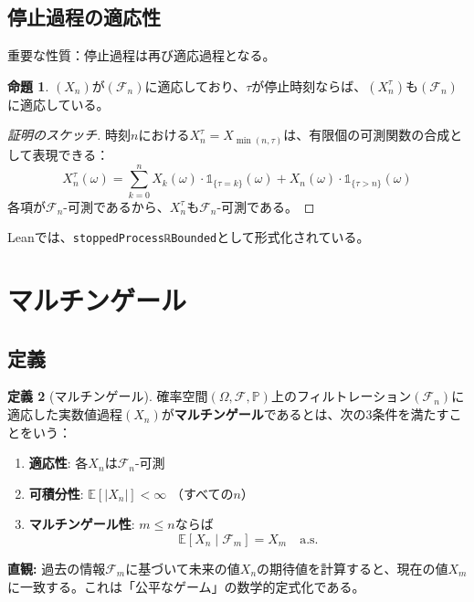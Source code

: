 \documentclass[a4paper,11pt]{ltjsarticle}
\theoremstyle{definition}
\newtheorem{definition}{定義}[section]
\newtheorem{proposition}[definition]{命題}
\begin{document}
\subsection{停止過程の適応性}

重要な性質：停止過程は再び適応過程となる。

\begin{proposition}
$(X_n)$が$(\mathcal{F}_n)$に適応しており、$\tau$が停止時刻ならば、$(X^{\tau}_n)$も$(\mathcal{F}_n)$に適応している。
\end{proposition}

\begin{proof}[証明のスケッチ]
時刻$n$における$X^{\tau}_n = X_{\min(n, \tau)}$は、有限個の可測関数の合成として表現できる：
\[
X^{\tau}_n(\omega) = \sum_{k=0}^{n} X_k(\omega) \cdot \mathbb{1}_{\{\tau = k\}}(\omega) + X_n(\omega) \cdot \mathbb{1}_{\{\tau > n\}}(\omega)
\]
各項が$\mathcal{F}_n$-可測であるから、$X^{\tau}_n$も$\mathcal{F}_n$-可測である。
\end{proof}

Leanでは、\texttt{stoppedProcessℝBounded}として形式化されている。

\section{マルチンゲール}

\subsection{定義}

\begin{definition}[マルチンゲール]
確率空間$(\Omega, \mathcal{F}, \mathbb{P})$上のフィルトレーション$(\mathcal{F}_n)$に適応した実数値過程$(X_n)$が\textbf{マルチンゲール}であるとは、次の3条件を満たすことをいう：
\begin{enumerate}
  \item \textbf{適応性}: 各$X_n$は$\mathcal{F}_n$-可測
  \item \textbf{可積分性}: $\mathbb{E}[|X_n|] < \infty$ （すべての$n$）
  \item \textbf{マルチンゲール性}: $m \leq n$ならば
  \[
  \mathbb{E}[X_n \mid \mathcal{F}_m] = X_m \quad \text{a.s.}
  \]
\end{enumerate}
\end{definition}

\textbf{直観:} 過去の情報$\mathcal{F}_m$に基づいて未来の値$X_n$の期待値を計算すると、現在の値$X_m$に一致する。これは「公平なゲーム」の数学的定式化である。
\end{document}
